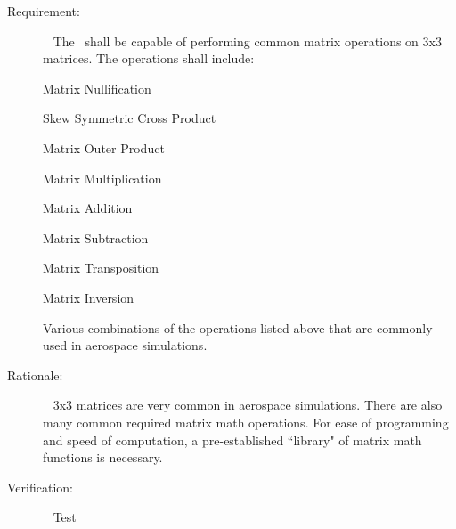 \label{reqt:matrix_math_operations}
\begin{description}
\item[Requirement:]\ \newline
The \mathDesc\ shall be capable of performing common matrix operations on 
3x3 matrices. The operations shall include:

   \subrequirement{}
   Matrix Nullification

   \subrequirement{}
   Skew Symmetric Cross Product

   \subrequirement{}
   Matrix Outer Product

   \subrequirement{}
   Matrix Multiplication

   \subrequirement{}
   Matrix Addition

   \subrequirement{}
   Matrix Subtraction

   \subrequirement{}
   Matrix Transposition

   \subrequirement{}
   Matrix Inversion

   \subrequirement{}
   Various combinations of the operations listed above that are commonly
   used in aerospace simulations.

\item[Rationale:]\ \newline
3x3 matrices are very common in aerospace simulations.  There are also many
common required matrix math operations. For ease of programming
and speed of computation, a pre-established ``library" of matrix math functions
is necessary.

\item[Verification:]\ \newline
Test

\end{description}



